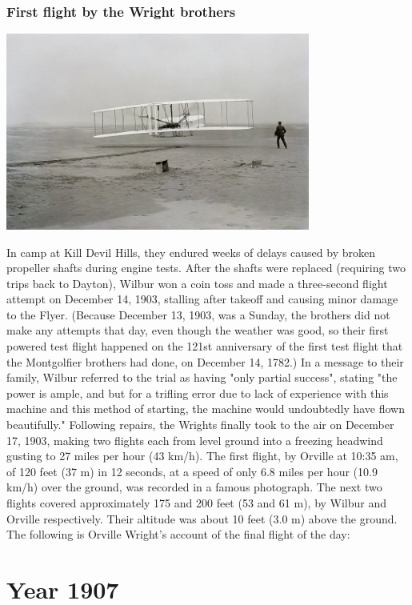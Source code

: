 \documentclass[11pt]{report}
\begin{document}
\subsection{First flight by the Wright brothers}
\vspace{2mm}\begin{center}\includegraphics[width=10cm]{./img/firstflight.jpg}\end{center}
In camp at Kill Devil Hills, they endured weeks of delays caused by broken propeller shafts during engine tests. After the shafts were replaced (requiring two trips back to Dayton), Wilbur won a coin toss and made a three-second flight attempt on December 14, 1903, stalling after takeoff and causing minor damage to the Flyer. (Because December 13, 1903, was a Sunday, the brothers did not make any attempts that day, even though the weather was good, so their first powered test flight happened on the 121st anniversary of the first test flight that the Montgolfier brothers had done, on December 14, 1782.) In a message to their family, Wilbur referred to the trial as having "only partial success", stating "the power is ample, and but for a trifling error due to lack of experience with this machine and this method of starting, the machine would undoubtedly have flown beautifully." Following repairs, the Wrights finally took to the air on December 17, 1903, making two flights each from level ground into a freezing headwind gusting to 27 miles per hour (43 km/h). The first flight, by Orville at 10:35 am, of 120 feet (37 m) in 12 seconds, at a speed of only 6.8 miles per hour (10.9 km/h) over the ground, was recorded in a famous photograph. The next two flights covered approximately 175 and 200 feet (53 and 61 m), by Wilbur and Orville respectively. Their altitude was about 10 feet (3.0 m) above the ground. The following is Orville Wright's account of the final flight of the day:

\chapter{Year 1907}
\end{document}

